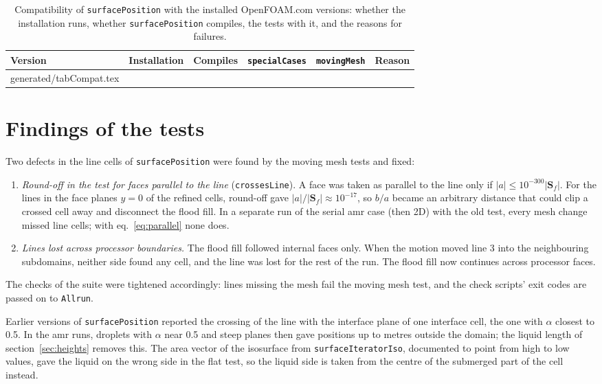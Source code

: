 \documentclass[11pt,a4paper]{article}
\makeatletter
\newcommand{\inputrows}[1]{\@@input #1 }
\newcommand{\sP}{\texttt{surfacePosition}}
\makeatother
\begin{document}
\begin{table}[!htbp]
  \centering
  \caption{Compatibility of \sP{} with the installed OpenFOAM.com versions:
    whether the installation runs, whether \sP{} compiles, the tests with
    it, and the reasons for failures.}
  \label{tab:compat}
  \small
  \begin{tabular}{llccc>{\raggedright\arraybackslash}p{}}
    \toprule
    Version & Installation & Compiles & \texttt{specialCases} & \texttt{movingMesh} & Reason \\
    \midrule
    \inputrows{generated/tabCompat.tex}
    \bottomrule
  \end{tabular}
\end{table}

\section{Findings of the tests}

Two defects in the line cells of \sP{} were found by the moving mesh tests
and fixed:
\begin{enumerate}
\item \emph{Round-off in the test for faces parallel to the line}
  (\texttt{crossesLine}). A face was taken as parallel to the line only if
  $|a| \le 10^{-300}|\mathbf{S}_f|$. For the lines in the face planes $y = 0$
  of the refined cells, round-off gave $|a|/|\mathbf{S}_f| \approx 10^{-17}$,
  so $b/a$ became an arbitrary distance that could clip a crossed cell away
  and disconnect the flood fill. In a separate run of the serial amr case
  (then 2D) with the old test, every mesh change missed line cells; with
  eq.~\eqref{eq:parallel} none does.
\item \emph{Lines lost across processor boundaries.} The flood fill followed
  internal faces only. When the motion moved line 3 into the neighbouring
  subdomains, neither side found any cell, and the line was lost for the rest
  of the run. The flood fill now continues across processor faces.
\end{enumerate}
The checks of the suite were tightened accordingly: lines missing the mesh
fail the moving mesh test, and the check scripts' exit codes are passed on to
\texttt{Allrun}.

Earlier versions of \sP{} reported the crossing of the line with the
interface plane of one interface cell, the one with $\alpha$ closest to 0.5.
In the amr runs, droplets with $\alpha$ near 0.5 and steep planes then gave
positions up to metres outside the domain; the liquid length of
section~\ref{sec:heights} removes this. The area vector of the isosurface from
\texttt{surfaceIteratorIso}, documented to point from high to low values, gave
the liquid on the wrong side in the flat test, so the liquid side is taken
from the centre of the submerged part of the cell instead.
\end{document}
